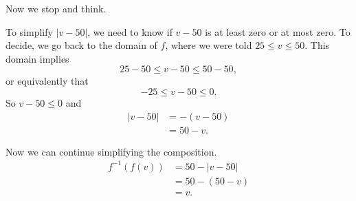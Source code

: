 \documentclass{ximera}
\begin{document}
\begin{example}
\begin{explanation}
\begin{enumerate}
Now we stop and think.

To simplify $| v-50 |$, we need to know if $v-50$ is at least zero or at most zero. To decide, we go back to the domain of $f$, where we were told $25\leq v\leq 50$. This domain implies
\[
    25 - 50 \leq  v - 50 \leq 50 - 50 ,
\]
or equivalently that
\[
   -25 \leq v - 50 \leq 0.
\]
So $v - 50\leq 0$ and
\begin{align*}
  | v - 50 | &= - (v-50) \\
                & = 50 - v.
\end{align*}

Now we can continue simplifying the composition.
\begin{align*}
  f^{-1}(f(v)) &= 50 - \left| v-50 \right| \\
                    &= 50 - (50 -v) \\
                    &=v. 
\end{align*}


\end{enumerate}
\end{explanation}
\end{example}
\end{document}
